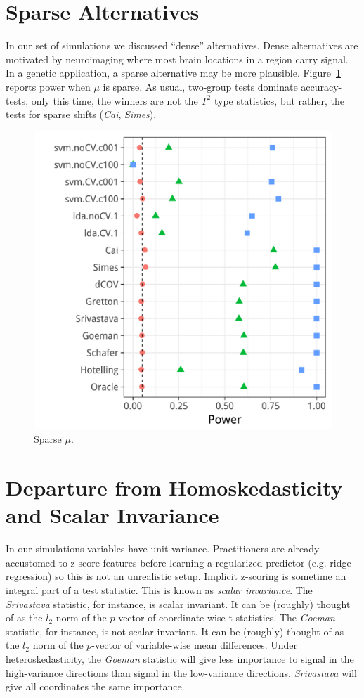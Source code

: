 \documentclass[]{bio}
\begin{document}
\section{Sparse Alternatives}
\label{sec:sparse}

In our set of simulations we discussed ``dense'' alternatives.
Dense alternatives are motivated by neuroimaging where most brain locations in a region carry signal.
In a genetic application, a sparse alternative may be more plausible. 
Figure~\ref{fig:sparse} reports power when $\mu$ is sparse. 
As usual, two-group tests dominate accuracy-tests, only this time, the winners are not the $T^2$ type statistics, but rather, the tests for sparse shifts (\emph{Cai}, \emph{Simes}).

\begin{figure}[h]
	\centering
	\centering
	\includegraphics[width=0.5\columnwidth]{"art/file34"}
	\caption{Sparse $\mu$.}  
	\label{fig:sparse}	
\end{figure}





\section{Departure from Homoskedasticity and Scalar Invariance}

In our simulations variables have unit variance. 
Practitioners are already accustomed to z-score features before learning a regularized predictor (e.g. ridge regression) so this is not an unrealistic setup.
Implicit z-scoring is sometime an integral part of a test statistic. 
This is known as \emph{scalar invariance}.
The \emph{Srivastava} statistic, for instance, is scalar invariant. 
It can be (roughly) thought of as the $l_2$ norm of the $p$-vector of coordinate-wise t-statistics.
The \emph{Goeman} statistic, for instance, is not scalar invariant. 
It can be (roughly) thought of as the $l_2$ norm of the $p$-vector of variable-wise mean differences.
Under heteroskedasticity, the \emph{Goeman} statistic will give less importance to signal in the high-variance directions than signal in the low-variance directions. 
\emph{Srivastava} will give all coordinates the same importance.
\end{document}
